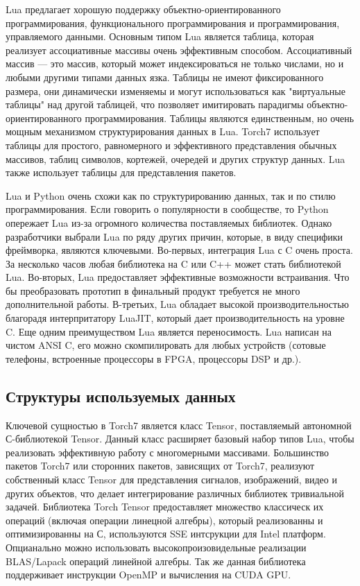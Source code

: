 \documentclass[a4paper,english,russian]{G2-105}
\begin{document}
\par Lua предлагает хорошую поддержку объектно-ориентированного программирования, функционального программирования и программирования, управляемого данными. Основным типом Lua является таблица, которая реализует ассоциативные массивы очень эффективным способом. Ассоциативный массив --- это массив, который может индексироваться не только числами, но и любыми другими типами данных язка. Таблицы не имеют фиксированного размера, они динамически изменяемы и могут использоваться как "виртуальные таблицы" над другой таблицей, что позволяет имитировать парадигмы объектно-ориентированного программирования. Таблицы являются единственным, но очень мощным механизмом структурирования данных в Lua. Torch7 использует таблицы для простого, равномерного и эффективного представления обычных массивов, таблиц символов, кортежей, очередей и других структур данных. Lua также использует таблицы для представления пакетов.
\par Lua и Python очень схожи как по структурированию данных, так и по стилю программирования. Если говорить о популярности в сообществе, то Python опережает Lua из-за огромного количества поставляемых библиотек. Однако разработчики выбрали Lua по ряду других причин, которые, в виду специфики фреймворка, являются ключевыми. Во-первых, интеграция Lua с C очень проста. За несколько часов любая библиотека на C или C++ может стать библиотекой Lua. Во-вторых, Lua предоставляет эффективные возможности встраивания. Что бы преобразовать прототип в финальный продукт требуется не много дополнительной работы. В-третьих, Lua обладает высокой производительностью благорадя интерпритатору LuaJIT, который дает производительность на уровне C. Еще одним преимуществом Lua является переносимость. Lua написан на чистом ANSI C, его можно скомпилировать для любых устройств (сотовые телефоны, встроенные процессоры в FPGA, процессоры DSP и др.).
\subsection{Структуры используемых данных}
\par Ключевой сущностью в Torch7 является класс Tensor, поставляемый автономной С-библиотекой Tensor. Данный класс расширяет базовый набор типов Lua, чтобы реализовать эффективную работу с многомерными массивами. Большинство пакетов Torch7 или сторонних пакетов, зависящих от Torch7, реализуют собственный класс Tensor для представления сигналов, изображений, видео и других объектов, что делает интегрирование различных библиотек тривиальной задачей. Библиотека Torch Tensor предоставляет множество классическ их операций (включая операции линецной алгебры), который реализованны и оптимизированны на С, используются SSE интсрукции для Intel платформ. Опцианально можно использовать высокопроизовидельные реализации BLAS/Lapack операций линейной алгебры. Так же данная библиотека поддерживает инструкции OpenMP и вычисления на CUDA GPU.
\end{document}

